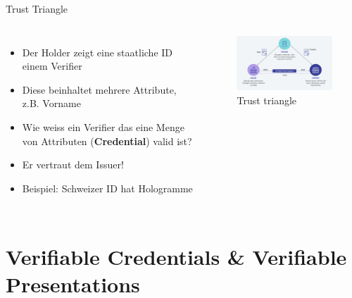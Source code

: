 \documentclass[
	german,%
	authorontitle=true,
	]{bfhbeamer}
\begin{document}
\begin{frame}{Trust Triangle}
    \begin{columns}[onlytextwidth,T]
        \column{70mm}  
        \begin{itemize}
            \item Der Holder zeigt eine staatliche ID einem Verifier
            \item Diese beinhaltet mehrere Attribute, z.B. Vorname
            \item Wie weiss ein Verifier das eine Menge von Attributen (\textbf{Credential}) valid ist?
            \item Er vertraut dem Issuer!
            \item Beispiel: Schweizer ID hat Hologramme
        \end{itemize}

        \column{70mm}

        \begin{figure}
            \centering
            \includegraphics[width=70mm]{../img/trusttriangle.png}
            \caption{Trust triangle}
        \end{figure}
        
    \end{columns}
\end{frame}

\section{Verifiable Credentials \& Verifiable Presentations}
\end{document}
